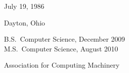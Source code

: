 %
%
%
\begin{center}
{\large\thesisauthor}
\end{center}
%
%
\newcommand{\vitalabel}[1]%
  {\raisebox{0pt}[1ex][0pt]
    {\makebox[\labelwidth][l]%
      {\parbox[t]{\labelwidth}{\hspace{0pt}\textbf{#1}}}}}
%
%
\begin{list}
  {}%
  { \renewcommand{\makelabel}{\vitalabel}%
    \setlength{\labelwidth}{100pt}%
    \setlength{\leftmargin}{120pt}%
    \setlength{\itemindent}{0pt}%
    \setlength{\parsep}{\baselineskip}%
    \setlength{\itemsep}{5pt}%
    }
\item[Date of Birth] July 19, 1986
\item[Place of Birth] Dayton, Ohio
\item[Degrees] B.S.\ Computer Science, December 2009 \\
	M.S.\ Computer Science, August 2010
\item[Professional\linebreak Societies]
  Association for Computing Machinery
%   
\end{list}
\flushright
\thesismonth\ \thesisyear

